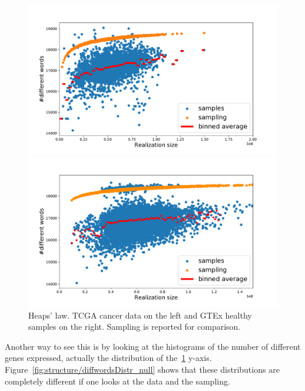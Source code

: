 \begin{figure}[htb!]
\begin{minipage}{0.5\textwidth}
    \centering
    \includegraphics[width=0.95\linewidth]{pictures/structure/tcga/heaps_null.pdf}
    \end{minipage}
\hspace{2mm}
\begin{minipage}{0.5\textwidth}
    \centering
    \includegraphics[width=0.95\linewidth]{pictures/structure/gtex/heaps_null.pdf}
    \end{minipage}
\caption{Heaps' law. TCGA cancer data on the left and GTEx healthy samples on the right. Sampling is reported for comparison.}
\label{fig:structure/heaps_null}
\end{figure}
\FloatBarrier
Another way to see this is by looking at the histograms of the number of different genes expressed, actually the distribution of the~\ref{fig:structure/heaps_null} y-axis. Figure~\ref{fig:structure/diffwordsDistr_null} shows that these distributions are completely different if one looks at the data and the sampling.
